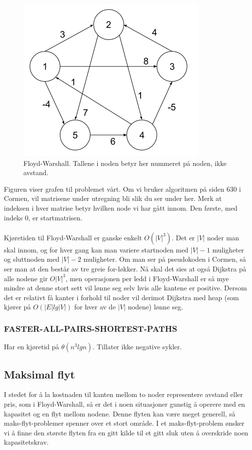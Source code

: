 \begin{figure}[H]
\includegraphics[scale=0.5]{images/floyd-warshall}
\centering %
\caption{Floyd-Warshall. Tallene i noden betyr her nummeret på noden, ikke avstand.}
\label{fig:floyd-warshall}
\end{figure}

\noindent Figuren viser grafen til problemet vårt. Om vi bruker algoritmen på siden 630 i Cormen, vil matrisene under utregning bli slik du ser under her. Merk at indeksen i hver matrise betyr hvilken node vi har gått innom. Den første, med indeks 0, er startmatrisen. 
\\\\
\noindent Kjøretiden til Floyd-Warshall er ganske enkelt $O(|V|^3)$. Det er $|V|$ noder man skal innom, og for hver gang kan man variere startnoden med $|V| - 1$ muligheter og sluttnoden med $|V| - 2$ muligheter. Om man ser på pseudokoden i Cormen, så ser man at den består av tre greie for-løkker. Nå skal det sies at også Dijkstra på alle nodene gir $O|V|^3$, men operasjonen per ledd i Floyd-Warshall er så mye mindre at denne stort sett vil lønne seg selv hvis alle kantene er positive. Dersom det er relativt få kanter i forhold til noder vil derimot Dijkstra med heap (som kjører på $O(|E| lg |V|)$ for hver av de $|V|$ nodene) lønne seg.

\subsubsection{FASTER-ALL-PAIRS-SHORTEST-PATHS}
Har en kjøretid på $\theta(n^3 lg n)$. Tillater ikke negative sykler.

\subsection{Maksimal flyt}
I stedet for å la kostnaden til kanten mellom to noder representere avstand eller pris, som i Floyd-Warshall, så er det i noen situasjoner gunstig å operere med en kapasitet og en flyt mellom nodene. Denne flyten kan være meget generell, så maks-flyt-problemer spenner over et stort område. I et maks-flyt-problem ønsker vi å finne den største flyten fra en gitt kilde til et gitt sluk uten å overskride noen kapasitetskrav.

